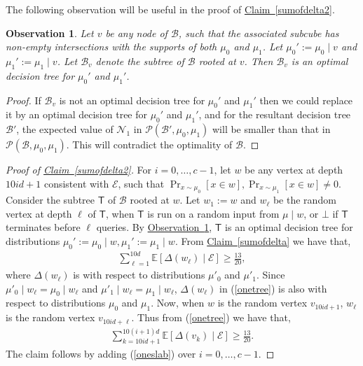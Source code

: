 \documentclass[11pt]{article}
\numberwithin{equation}{section}
\theoremstyle{definition}
\theoremstyle{plain}
\newcommand{\expref}[2]{\hyperref[#2]{#1~\ref{#2}}}
\newcommand{\clB}{\mathcal{B}}
\newcommand{\clE}{\mathcal{E}}
\newcommand{\clP}{\mathcal{P}}
\newcommand{\clN}{\mathcal{N}}
\newcommand{\E}{\mathbb{E}}
\newtheorem{observation}[theorem]{Observation}
\begin{document}
The following observation will be useful in the proof of \expref{Claim}{sumofdelta2}.
\begin{observation}
\label{recursive}
Let $v$ be any node of $\clB$, such that the associated subcube has non-empty intersections with the supports of both $\mu_0$ and $\mu_1$. Let $\mu_0':=\mu_0 \mid v$ and $\mu_1':=\mu_1 \mid v$. Let $\clB_v$ denote the subtree of $\clB$ rooted at $v$. Then $\clB_v$ is an optimal  decision tree for $\mu_0'$ and $\mu_1'$.
\end{observation}
\begin{proof}
If $\clB_v$ is not an optimal decision tree for $\mu_0'$ and $\mu_1'$ then we could replace it by an optimal decision tree for $\mu_0'$ and $\mu_1'$, and for the resultant decision tree $\clB'$, the expected value of $\clN_1$ in $\clP(\clB', \mu_0, \mu_1)$ will be smaller than that in $\clP(\clB, \mu_0, \mu_1)$. This will contradict the optimality of $\clB$.
\end{proof}
\begin{proof}[Proof of {\expref{Claim}{sumofdelta2}}]
For $i=0,\ldots, c-1$, let $w$ be any vertex at depth $10id+1$ consistent with $\clE$, such that $\Pr_{x \sim \mu_0}[x \in w], \Pr_{x \sim \mu_1}[x \in w] \neq 0$. Consider the subtree $\mathsf{T}$ of $\clB$ rooted at $w$. Let $w_1:=w$ and $w_\ell$ be the random vertex at depth $\ell$ of $\mathsf{T}$, when $\mathsf{T}$ is run on a random input from $\mu \mid w$, or $\bot$ if $\mathsf{T}$ terminates before $\ell$ queries. By \expref{Observation}{recursive}, $\mathsf{T}$ is an optimal decision tree for distributions $\mu_0':=\mu_0 \mid w, \mu_1':=\mu_1 \mid w$. From \expref{Claim}{sumofdelta} we have that,
\begin{align}
\sum_{\ell=1}^{10d} \E[\Delta(w_\ell) \mid \clE]  \geq \frac{13}{20}, \label{onetree}
\end{align}
where $\Delta(w_\ell)$ is with respect to distributions $\mu'_0$ and $\mu'_1$. Since $\mu'_0 \mid w_\ell=\mu_0 \mid w_\ell$ and $\mu'_1 \mid w_\ell=\mu_1 \mid w_\ell$, $\Delta(w_\ell)$ in (\ref{onetree}) is also with respect to distributions $\mu_0$ and $\mu_1$. Now, when $w$ is the random vertex $v_{10id+1}$, $w_\ell$ is the random vertex $v_{10id+\ell}$. Thus from (\ref{onetree}) we have that,
\begin{align}
\sum _{k=10id+1}^{10(i+1)d} \E[\Delta(v_k) \mid \clE]  \geq \frac{13}{20}. \label{oneslab}
\end{align}
The claim follows by adding (\ref{oneslab}) over $i=0, \ldots, c-1$.
\end{proof}
\end{document}
